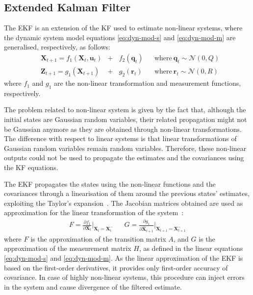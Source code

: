 \subsection{Extended Kalman Filter}

\noindent The \gls{EKF} is an extension of the \gls{KF} used to estimate non-linear systems, where the dynamic system model equations \eqref{eq:dyn-mod-s} and \eqref{eq:dyn-mod-m} are generalised, respectively, as follows:
\begin{align}
\label{eq:nonlinearf}
&\mathbf{X}_{t+1}  =  f_1(\mathbf{X}_{t}, \mathbf{u}_t)& + ~~~~   f_2(\mathbf{q}_t) &&
    \textrm{where}~\mathbf{q}_t \sim \mathcal{N}(0, Q)\\
&\mathbf{Z}_{t+1}  =  g_1(\mathbf{X}_{t+1}) & + ~~~~ g_2(\mathbf{r}_t) &&
    \textrm{where}~\mathbf{r}_t \sim \mathcal{N}(0, R)
\end{align}
where $f_1$ and $g_1$ are the non-linear transformation and measurement functions, respectively.


The problem related to non-linear system is given by the fact that, although the initial states are Gaussian random variables, their related propagation might not be Gaussian anymore as they are obtained through non-linear transformations. The difference with respect to linear systems is that linear transformations of Gaussian random variables remain random variables.
Therefore, these non-linear outputs could not be used to propagate the estimates and the covariances using the \gls{KF} equations.

The \gls{EKF} propagates the states using the non-linear functions and the covariances through a linearisation of them around the previous states' estimates, exploiting the Taylor's expansion~\cite{thrun_probabilistic_2005}.
The Jacobian matrices obtained are used as approximation for the linear transformation of the system~\cite{1386886}:
\newcommand{\partialat}[2]{\frac{\partial {#1}}{\partial {#2}}}
\begin{align}
F = \partialat{f_1}{\mathbf{X}_{t}}\Bigr|_{\mathbf{X}_{t} = \mathbf{X}_{t}^-} & &
G = \partialat{g_1}{\hat{\mathbf{X}}_{t+1}}\Bigr|_{\mathbf{X}_{t+1} = \mathbf{X}_{t+1}^-}
\end{align}
where $F$ is the approximation of the transition matrix $A$, and $G$ is the approximation of the measurement matrix $H$, as defined in the linear equations \eqref{eq:dyn-mod-s} and \eqref{eq:dyn-mod-m}.
As the linear approximation of the \gls{EKF} is based on the first-order derivatives, it provides only first-order accuracy of covariance. In case of highly non-linear systems, this procedure can inject errors in the system and cause divergence of the filtered estimate.

